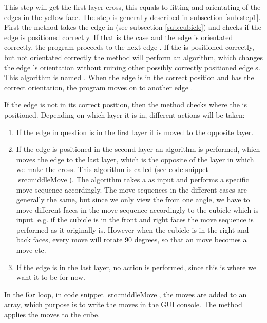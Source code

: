 This step will get the first layer cross, this equals to fitting and orientating of the edges in the yellow face. 
The step is generally described in subsection \ref{sub:step1}.
First the method takes the edge \cubie{} in \cubicle{}  (see subsection \ref{sub:cubicle}) 
and checks if the edge \cpiece{} is positioned correctly.
If that is the case and the edge \cpiece{} is orientated correctly, the program proceeds to the next edge \cpiece{}.
If the \cubicle{} is positioned correctly, but not orientated correctly the method will perform an algorithm, which changes the edge \cpiece{}'s orientation without ruining other possibly correctly positioned edge \cpiece{}s. 
This algorithm is named . When the edge \cpiece{} is in the correct position and has the correct orientation, the program moves on to another edge \cpiece{}. 

If the edge \cpiece{} is not in its correct position, then the method checks where the \cpiece{} is positioned. 
Depending on which layer it is in, different actions will be taken:
\begin{enumerate}
	\item If the edge \cpiece{} in question is in the first layer it is moved to the opposite layer.
	\item If the edge \cpiece{} is positioned in the second layer an algorithm is performed, which moves the edge \cpiece{} to the last layer, which is the opposite of the layer in which we make the cross. This algorithm is called  (see code snippet \ref{src:middleMove}). 
	The algorithm takes a \cubicle{} as input and performs a specific move sequence accordingly.
	The move sequences in the different cases are generally the same, but since we only view the \rubik{} from one angle, we have to move different faces in the move sequence accordingly to the cubicle which is input. e.g. if the cubicle is in the front and right faces the move sequence is performed as it originally is. 
	However when the cubicle is in the right and back faces, every move will rotate 90 degrees, so that an  move becomes a  move etc.
	\item If the edge \cubie{} is in the last layer, no action is performed, since this is where we want it to be for now.
\end{enumerate}

In the \textbf{for} loop, in code snippet \ref{src:middleMove}, the moves are added to an array, which purpose is to write the moves in the GUI console. 
The  method applies the moves to the cube.

